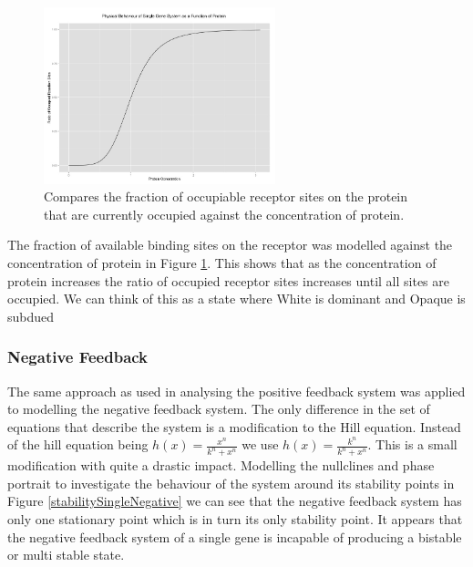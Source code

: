 \documentclass[]{article}
\begin{document}
                    
             \begin{figure}[h!]
            \centering
            \includegraphics[width=0.6\textwidth]{./figures/singlePositiveHill.jpeg}
            \caption{Compares the fraction of occupiable receptor sites on the protein that are currently occupied against the concentration of protein.}
            \label{singlePositiveHill}
            \end{figure}
    
            The fraction of available binding sites on the receptor was modelled against the concentration of protein in Figure \ref{singlePositiveHill}. This shows that as the concentration of protein increases the ratio of occupied receptor sites increases until all sites are occupied. We can think of this as a state where %
            White is dominant and Opaque is subdued %
            
            \subsubsection{Negative Feedback} 
            The same approach as used in analysing the positive feedback system was applied to modelling the negative feedback system. The only difference in the set of equations that describe the system is a modification to the Hill equation. Instead of the hill equation being $h(x) = \frac{x^n}{k^n + x^n}$ we use $h(x) = \frac{k^n}{k^n+x^n}$. This is a small modification with quite a drastic impact. Modelling the nullclines and phase portrait to investigate the behaviour of the system around its stability points in Figure \ref{stabilitySingleNegative} we can see that the negative feedback system has only one stationary point which is in turn its only stability point. It appears that the negative feedback system of a single gene is incapable of producing a bistable or multi stable state.
            
\end{document}
